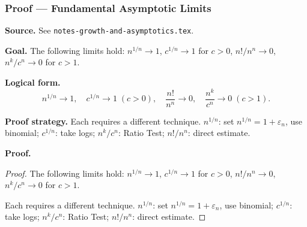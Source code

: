 
\clearpage
{}
\hypertarget{proof-RA-ABB-T-fundamental-asymptotics}{}

\subsubsection[Fundamental Asymptotic Limits]{Proof --- Fundamental Asymptotic Limits}

\bigskip

\noindent
\textbf{Source.} See \texttt{notes-growth-and-asymptotics.tex}.

\vspace{0.75em}

\noindent
\textbf{Goal.} The following limits hold: $n^{1/n} \to 1$, $c^{1/n} \to 1$ for $c > 0$, $n!/n^n \to 0$, $n^k/c^n \to 0$ for $c > 1$.

\vspace{0.75em}

\noindent
\textbf{Logical form.}
\[
  n^{1/n} \to 1,\quad c^{1/n} \to 1 \;(c>0),\quad \frac{n!}{n^n} \to 0,\quad \frac{n^k}{c^n} \to 0 \;(c>1).
\]

\vspace{0.75em}

\noindent
\textbf{Proof strategy.} Each requires a different technique. $n^{1/n}$: set $n^{1/n} = 1 + \varepsilon_n$, use binomial; $c^{1/n}$: take logs; $n^k/c^n$: Ratio Test; $n!/n^n$: direct estimate.

\vspace{0.75em}

\noindent
\textbf{Proof.}
\begin{proof}
\Claim The following limits hold: $n^{1/n} \to 1$, $c^{1/n} \to 1$ for $c > 0$, $n!/n^n \to 0$, $n^k/c^n \to 0$ for $c > 1$.

\Given 

\Goal 

\Strategy Each requires a different technique. $n^{1/n}$: set $n^{1/n} = 1 + \varepsilon_n$, use binomial; $c^{1/n}$: take logs; $n^k/c^n$: Ratio Test; $n!/n^n$: direct estimate.

\medskip


\end{proof}

